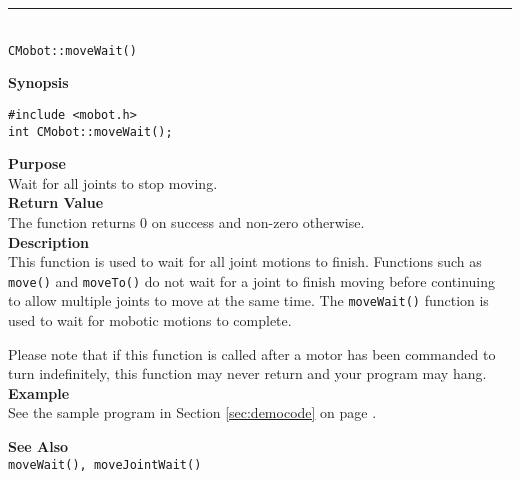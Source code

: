 \noindent
\vspace{5pt}
\rule{4.5in}{0.015in}\\
\noindent
{\LARGE \texttt{CMobot::moveWait()}}\\
{}

\noindent
{\bf Synopsis}
\vspace{-8pt}
\begin{verbatim}
#include <mobot.h>
int CMobot::moveWait();
\end{verbatim}

\noindent
{\bf Purpose}\\
Wait for all joints to stop moving.\\

\noindent
{\bf Return Value}\\
The function returns 0 on success and non-zero otherwise.\\

\noindent
{\bf Description}\\
This function is used to wait for all joint motions to finish. Functions such as
\texttt{move()} and \texttt{moveTo()} do not wait for a joint to finish
moving before continuing to allow multiple joints to move at the same time. The
\texttt{moveWait()} function is used to wait for
mobotic motions to complete.

Please note that if this function is called after a motor has been commanded to
turn indefinitely, this function may never return and your program may hang.\\

\noindent
{\bf Example}\\
See the sample program in Section \ref{sec:democode} on page \pageref{sec:democode}.
\noindent

\noindent
{\bf See Also}\\
\texttt{moveWait(), moveJointWait()}

